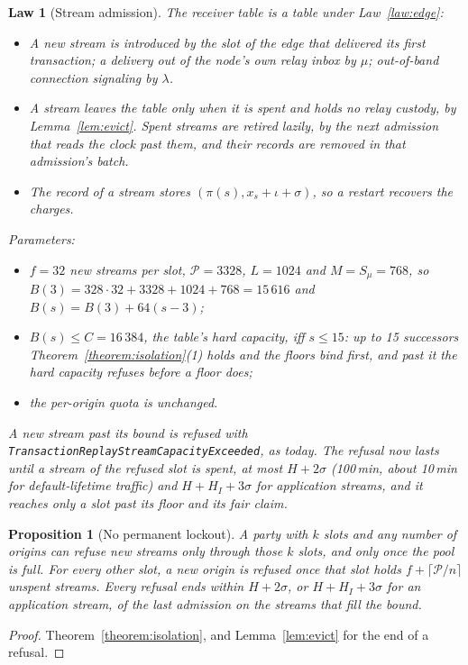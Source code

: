 \documentclass[journal]{IEEEtran}
\newtheorem{law}{Law}
\newtheorem{proposition}{Proposition}
\newcommand{\Pool}{\mathcal{P}}
\begin{document}
\begin{law}[Stream admission]\label{law:streams}
The receiver table is a table under Law~\ref{law:edge}:
\begin{itemize}[leftmargin=1.2em]
\item A \emph{new} stream is introduced by the slot of the edge that delivered its first
transaction; a delivery out of the node's own relay inbox by $\mu$; out-of-band connection
signaling by $\lambda$.
\item A stream leaves the table only when it is spent and holds no relay custody, by
Lemma~\ref{lem:evict}.  Spent streams are retired lazily, by the next admission that reads the
clock past them, and their records are removed in that admission's batch.
\item The record of a stream stores $(\pi(s), x_s+\iota+\sigma)$, so a restart recovers the
charges.
\end{itemize}
Parameters:
\begin{itemize}[leftmargin=1.2em]
\item $f=32$ new streams per slot, $\Pool=3328$, $L=1024$ and $M=S_\mu=768$, so
$B(3)=328\cdot32+3328+1024+768=15\,616$ and $B(s)=B(3)+64(s-3)$;
\item $B(s)\le C=16\,384$, the table's hard capacity, iff $s\le15$: up to 15 successors
Theorem~\ref{theorem:isolation}(1) holds and the floors bind first, and past it the hard capacity
refuses before a floor does;
\item the per-origin quota is unchanged.
\end{itemize}
A new stream past its bound is refused with \texttt{TransactionReplayStreamCapacityExceeded}, as
today.  The refusal now lasts until a stream of the refused slot is spent, at most $H+2\sigma$
(100\,min, about 10\,min for default-lifetime traffic) and $H+H_I+3\sigma$ for application
streams, and it reaches only a slot past its floor and its fair claim.
\end{law}

\begin{proposition}[No permanent lockout]\label{prop:nolockout}
A party with $k$ slots and any number of origins can refuse new streams only through those $k$
slots, and only once the pool is full.  For every other slot, a new origin is refused once that
slot holds $f+\lceil\Pool/n\rceil$ unspent streams.  Every refusal ends within $H+2\sigma$, or
$H+H_I+3\sigma$ for an application stream, of the last admission on the streams that fill the
bound.
\end{proposition}
\begin{proof}
Theorem~\ref{theorem:isolation}, and Lemma~\ref{lem:evict} for the end of a refusal.
\end{proof}
\end{document}
